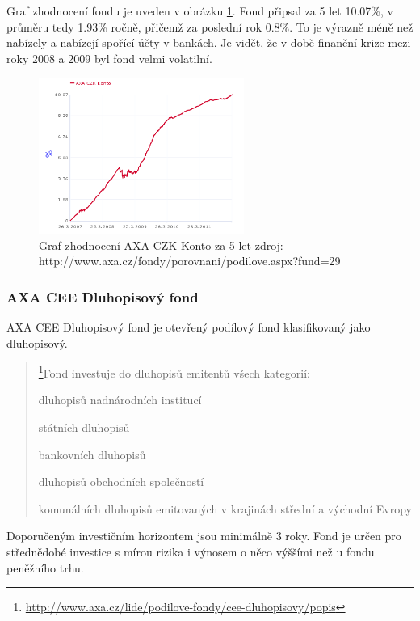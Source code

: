 \documentclass[a4paper,12pt]{article}
\begin{document}
			Graf zhodnocení fondu je uveden v obrázku \ref{axa_czk_konto}. Fond připsal za 5 let 10.07\%, v průměru tedy 1.93\% ročně, přičemž za poslední rok 0.8\%. To je výrazně méně než nabízely a nabízejí spořící účty v bankách. Je vidět, že v době finanční krize mezi roky 2008 a 2009 byl fond velmi volatilní. 
			\begin{figure}[h!]
		  	\centering
				\includegraphics[width=0.6\textwidth]{axa_czk_konto.png}			
				\caption{Graf zhodnocení AXA CZK Konto za 5 let zdroj: http://www.axa.cz/fondy/porovnani/podilove.aspx?fund=29}
				\label{axa_czk_konto}
			\end{figure}
		\subsubsection{AXA CEE Dluhopisový fond}
			AXA CEE Dluhopisový fond je otevřený podílový fond klasifikovaný jako dluhopisový. 
			\begin{quote}
				\footnote{\url{http://www.axa.cz/lide/podilove-fondy/cee-dluhopisovy/popis}}Fond investuje do dluhopisů emitentů všech kategorií:
				\begin{compactitem}
			    \item dluhopisů nadnárodních institucí
			    \item státních dluhopisů
			    \item bankovních dluhopisů
			    \item dluhopisů obchodních společností
			    \item komunálních dluhopisů emitovaných v krajinách střední a východní Evropy			
    	  \end{compactitem}
		  \end{quote}						
			
			Doporučeným investičním horizontem jsou minimálně 3 roky. Fond je určen pro střednědobé investice s mírou rizika i výnosem o něco výššími než u fondu peněžního trhu.
			
\end{document}
